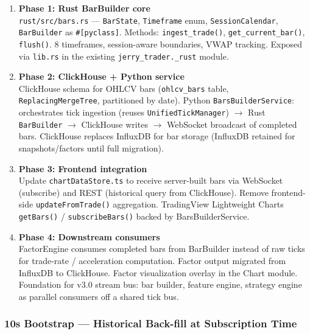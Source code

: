 \documentclass[a4paper, 11pt]{article}
\begin{document}
\begin{enumerate}
    \item \textbf{Phase 1: Rust BarBuilder core} \\
    \texttt{rust/src/bars.rs} --- \texttt{BarState}, \texttt{Timeframe} enum,
    \texttt{SessionCalendar}, \texttt{BarBuilder} as \texttt{\#[pyclass]}.
    Methods: \texttt{ingest\_trade()}, \texttt{get\_current\_bar()}, \texttt{flush()}.
    8 timeframes, session-aware boundaries, VWAP tracking.
    Exposed via \texttt{lib.rs} in the existing \texttt{jerry\_trader.\_rust} module.

    \item \textbf{Phase 2: ClickHouse + Python service} \\
    ClickHouse schema for OHLCV bars (\texttt{ohlcv\_bars} table,
    \texttt{ReplacingMergeTree}, partitioned by date).
    Python \texttt{BarsBuilderService}: orchestrates tick ingestion
    (reuses \texttt{UnifiedTickManager}) $\to$ Rust \texttt{BarBuilder}
    $\to$ ClickHouse writes $\to$ WebSocket broadcast of completed bars.
    ClickHouse replaces InfluxDB for bar storage (InfluxDB retained for
    snapshots/factors until full migration).

    \item \textbf{Phase 3: Frontend integration} \\
    Update \texttt{chartDataStore.ts} to receive server-built bars via WebSocket
    (subscribe) and REST (historical query from ClickHouse).
    Remove frontend-side \texttt{updateFromTrade()} aggregation.
    TradingView Lightweight Charts \texttt{getBars()} / \texttt{subscribeBars()} backed
    by BarsBuilderService.

    \item \textbf{Phase 4: Downstream consumers} \\
    FactorEngine consumes completed bars from BarBuilder instead of raw ticks
    for trade-rate / acceleration computation.
    Factor output migrated from InfluxDB to ClickHouse.
    Factor visualization overlay in the Chart module.
    Foundation for v3.0 stream bus: bar builder, feature engine, strategy engine
    as parallel consumers off a shared tick bus.
\end{enumerate}

\subsubsection{10s Bootstrap --- Historical Back-fill at Subscription Time}
\label{sec:10s-bootstrap}
\end{document}
